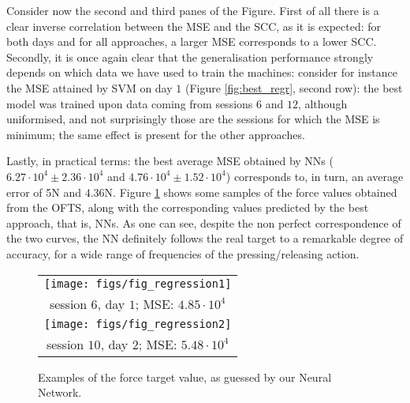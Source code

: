 Consider now the second and third panes of the Figure. First of all
there is a clear inverse correlation between the MSE and the SCC, as
it is expected: for both days and for all approaches, a larger MSE
corresponds to a lower SCC. Secondly, it is once again clear that the
generalisation performance strongly depends on which data we have used
to train the machines: consider for instance the MSE attained by SVM
on day $1$ (Figure
\ref{fig:best_regr}, second row): the best model was trained upon
data coming from sessions $6$ and $12$, although uniformised, and not
surprisingly those are the sessions for which the MSE is minimum; the
same effect is present for the other approaches.

Lastly, in practical terms: the best average MSE obtained by NNs
($6.27\cdot 10^4 \pm 2.36\cdot 10^4$ and $4.76\cdot 10^4 \pm 1.52\cdot
10^4$) corresponds to, in turn, an average error of 5N and
$4.36$N. Figure \ref{fig:regression} shows some samples of the force
values obtained from the OFTS, along with the corresponding values
predicted by the best approach, that is, NNs. As one can see, despite
the non perfect correspondence of the two curves, the NN definitely
follows the real target to a remarkable degree of accuracy, for a wide
range of frequencies of the pressing/releasing action.

\begin{figure}\centering
  \begin{tabular}{c}
    \texttt{[image: figs/fig\_regression1]}\\
    session $6$, day $1$; MSE: $4.85\cdot 10^4$\\
    \texttt{[image: figs/fig\_regression2]}\\
    session $10$, day $2$; MSE: $5.48\cdot 10^4$
  \end{tabular}
  \caption{Examples of the force target value, as guessed by our
    Neural Network.}
  \label{fig:regression}
\end{figure}
